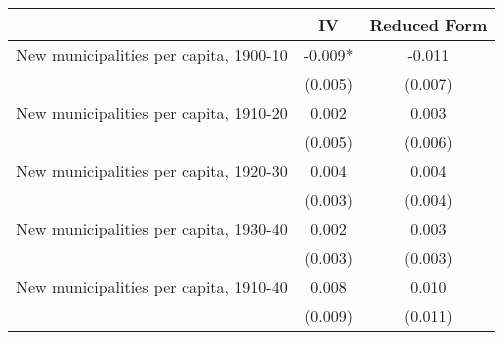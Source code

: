  \begin{tabular}{l*{2}{c}} \toprule
                &\multicolumn{1}{c}{IV}&\multicolumn{1}{c}{Reduced Form}\\
\midrule
New municipalities per capita, 1900-10&   -0.009*  &   -0.011   \\
                &  (0.005)   &  (0.007)   \\
\addlinespace
New municipalities per capita, 1910-20&    0.002   &    0.003   \\
                &  (0.005)   &  (0.006)   \\
\addlinespace
New municipalities per capita, 1920-30&    0.004   &    0.004   \\
                &  (0.003)   &  (0.004)   \\
\addlinespace
New municipalities per capita, 1930-40&    0.002   &    0.003   \\
                &  (0.003)   &  (0.003)   \\
\addlinespace
New municipalities per capita, 1910-40&    0.008   &    0.010   \\
                &  (0.009)   &  (0.011)   \\
       \bottomrule \end{tabular}
